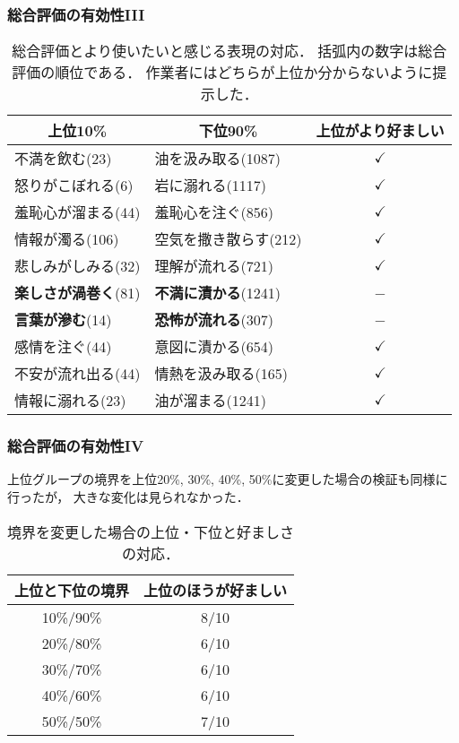 \documentclass[12pt,usepdftitle=false]{beamer}
\newcommand\header[1]{\multicolumn{1}{c}{\textbf{#1}}}
\begin{document}
\begin{frame}
    \frametitle{総合評価の有効性III}
    \begin{table}[t]
        \centering\footnotesize
        \begin{tabular}{llc}
            \toprule%
            \header{上位10\%}
            & \header{下位90\%}
            & \header{上位がより好ましい} \\
            \midrule
            不満を飲む(23)       & 油を汲み取る(1087)    & $\checkmark$ \\
            怒りがこぼれる(6)    & 岩に溺れる(1117)      & $\checkmark$ \\
            羞恥心が溜まる(44)   & 羞恥心を注ぐ(856)     & $\checkmark$ \\
            情報が濁る(106)      & 空気を撒き散らす(212) & $\checkmark$ \\
            悲しみがしみる(32)   & 理解が流れる(721)     & $\checkmark$ \\
            \textbf{楽しさが渦巻く}(81)   & \textbf{不満に漬かる}(1241)    & − \\
            \textbf{言葉が滲む}(14)       & \textbf{恐怖が流れる}(307)     & − \\
            感情を注ぐ(44)       & 意図に漬かる(654)     & $\checkmark$ \\
            不安が流れ出る(44)   & 情熱を汲み取る(165)   & $\checkmark$ \\
            情報に溺れる(23)     & 油が溜まる(1241)      & $\checkmark$ \\
            \bottomrule
        \end{tabular}
        \caption{総合評価とより使いたいと感じる表現の対応．
                括弧内の数字は総合評価の順位である．
                作業者にはどちらが上位か分からないように提示した．}\label{tab:human}
    \end{table}
\end{frame}

\begin{frame}
    \frametitle{総合評価の有効性IV}
    上位グループの境界を上位20\%, 30\%, 40\%, 50\%に変更した場合の検証も同様に行ったが，
    大きな変化は見られなかった．

    \bigskip

    \begin{table}[t]
        \footnotesize
        \begin{tabular}{cc}
            \toprule
            \header{上位と下位の境界} & \header{上位のほうが好ましい} \\
            \midrule
            10\%/90\% & 8/10 \\
            20\%/80\% & 6/10 \\
            30\%/70\% & 6/10 \\
            40\%/60\% & 6/10 \\
            50\%/50\% & 7/10 \\
            \bottomrule
        \end{tabular}
        \caption{境界を変更した場合の上位・下位と好ましさの対応．}
    \end{table}
\end{frame}
\end{document}
